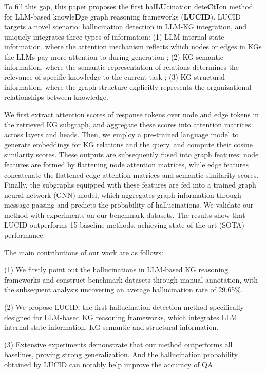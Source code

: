 \documentclass[11pt]{article}
\begin{document}
To fill this gap, this paper proposes the first hal\textbf{LU}cination dete\textbf{C}t\textbf{I}on method for LLM-based knowle\textbf{D}ge graph reasoning frameworks (\textbf{LUCID}). 
LUCID targets a novel scenario: hallucination detection in LLM-KG integration, and uniquely integrates three types of information: (1) LLM internal state information, where the attention mechanism reflects which nodes or edges in KGs the LLMs pay more attention to during generation \cite{azaria2023internal, sun2025redeep}; (2) KG semantic information, where the semantic representation of relations determines the relevance of specific knowledge to the current task \cite{lin2015learning}; (3) KG structural information, where the graph structure explicitly represents the organizational relationships between knowledge. 


We first extract attention scores of response tokens over node and edge tokens in the retrieved KG subgraph, and aggregate these scores into attention matrices across layers and heads. Then, we employ a pre-trained language model to generate embeddings for KG relations and the query, and compute their cosine similarity scores. These outputs are subsequently fused into graph features: node features are formed by flattening node attention matrices, while edge features concatenate the flattened edge attention matrices and semantic similarity scores. Finally, the subgraphs equipped with these features are fed into a trained graph neural network (GNN) model, which aggregates graph information through message passing and predicts the probability of hallucinations. We validate our method with experiments on our benchmark datasets. The results show that LUCID outperforms 15 baseline methods, achieving state-of-the-art (SOTA) performance.

The main contributions of our work are as follows: 

(1) We firstly point out the hallucinations in LLM-based KG reasoning frameworks and construct benchmark datasets through manual annotation, with the subsequent analysis uncovering an average hallucination rate of 29.65\%.

(2) We propose LUCID, the first hallucination detection method specifically designed for LLM-based KG reasoning frameworks, which integrates LLM internal state information, KG semantic and structural information.

(3) Extensive experiments demonstrate that our method outperforms all baselines, proving strong generalization. And the hallucination probability obtained by LUCID can notably help improve the accuracy of QA.
\end{document}
